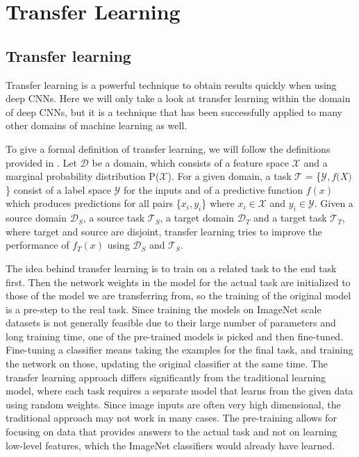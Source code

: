 \chapter{Transfer Learning}

\section{Transfer learning}
Transfer learning is a powerful technique to obtain results quickly when using deep CNNs. Here we will only take a look at transfer learning within the domain of deep CNNs, but it is a technique that has been successfully applied to many other domains of machine learning as well.

To give a formal definition of transfer learning, we will follow the definitions provided in \citep{transferSurvey2010}. Let $\mathcal{D}$ be a domain, which consists of a feature space $\mathcal{X}$ and a marginal probability distribution P($\mathcal{X}$). For a given domain, a task $\mathcal{T}$ = \{$\mathcal{Y}, f\mathcal(X)$\} consist of a label space $\mathcal{Y}$ for the inputs and of a predictive function $f(x)$ which produces predictions for all pairs \{$x_i, y_i$\} where $x_i \in \mathcal{X}$ and $y_i \in \mathcal{Y}$. Given a source domain $\mathcal{D}_S$, a source task $\mathcal{T}_S$, a target domain $\mathcal{D}_T$ and a target task $\mathcal{T}_T$, where target and source are disjoint, transfer learning tries to improve the performance of $f_T(x)$ using $\mathcal{D}_S$ and $\mathcal{T}_S$.

The idea behind transfer learning is to train on a related task to the end task first. Then the network weights in the model for the actual task are initialized to those of the model we are transferring from, so the training of the original model is a pre-step to the real task. Since training the models on ImageNet \citep{imagenet} scale datasets is not generally feasible due to their large number of parameters and long training time, one of the pre-trained models is picked and then fine-tuned. Fine-tuning a classifier means taking the examples for the final task, and training the network on those, updating the original classifier at the same time. The transfer learning approach differs significantly from the traditional learning model, where each task requires a separate model that learns from the given data using random weights. Since image inputs are often very high dimensional, the traditional approach may not work in many cases. The pre-training allows for focusing on data that provides answers to the actual task and not on learning low-level features, which the ImageNet classifiers would already have learned.

